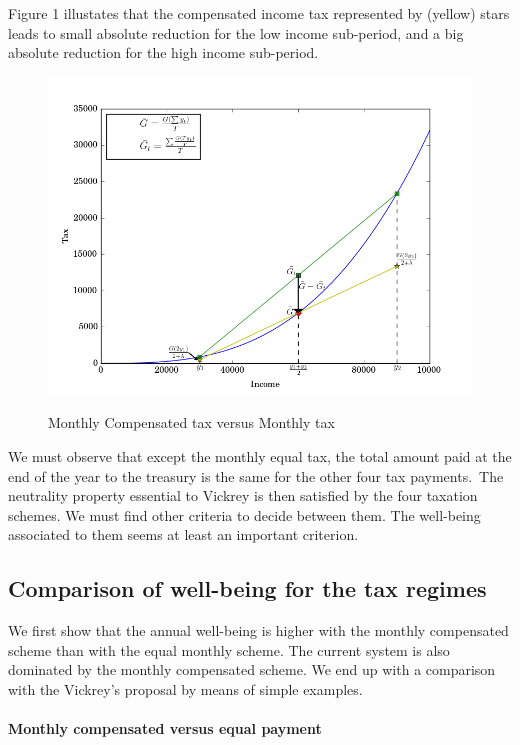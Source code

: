 Figure 1 illustates that the compensated income tax represented by (yellow)
stars leads to small absolute reduction for the low income sub-period, and a
big absolute reduction for the high income sub-period.




\begin{figure}[ptb]
\caption{Monthly Compensated tax versus Monthly tax}
{\centering\includegraphics[width=1.0\textwidth]{./image_graph2.png}}
\end{figure}

We must observe that except the monthly equal tax, the total amount paid at
the end of the year to the treasury is the same for the other four tax
payments.\ The neutrality property essential to Vickrey is then satisfied by
the four taxation schemes. We must find other criteria to decide between them.
The well-being associated to them seems at least an important criterion.\ 

\subsection{Comparison of well-being for the tax regimes}

We first show that the annual well-being is higher with the monthly
compensated scheme than with the equal monthly scheme. The current system is
also dominated by the monthly compensated scheme. We end up with a comparison
with the Vickrey's proposal by means of simple examples.

\paragraph{Monthly compensated versus equal payment\medskip}

